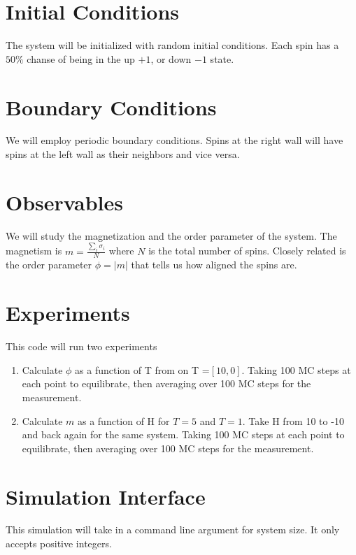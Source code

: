 \documentclass[]{scrartcl}
\begin{document}
\section{Initial Conditions}
The system will be initialized with random initial conditions. Each spin has a $50\%$ chanse of being in the up $+1$, or down $-1$ state.

\section{Boundary Conditions}
We will employ periodic boundary conditions. Spins at the right wall will have spins at the left wall as their neighbors and vice versa. 


\section{Observables}
We will study the magnetization and the order parameter of the system. 
The magnetism is $m =\frac{\sum_i \sigma_i}{N}$ where $N$ is the total number of spins. Closely related is the order parameter $\phi = |m|$ that tells us how aligned the spins are.

\section{Experiments}
This code will run two experiments
\begin{enumerate}
\item Calculate $\phi$ as a function of T from on T =$[10,0]$. Taking 100 MC steps at each point to equilibrate, then averaging over 100 MC steps for the measurement. 
\item Calculate $m$ as a function of H for $T = 5$ and $T = 1$. Take H from 10 to -10 and back again for the same system. Taking 100 MC steps at each point to equilibrate, then averaging over 100 MC steps for the measurement. 
\end{enumerate}


\section{Simulation Interface}
This simulation will take in a command line argument for system size. It only accepts positive integers.

\pagebreak
\end{document}
